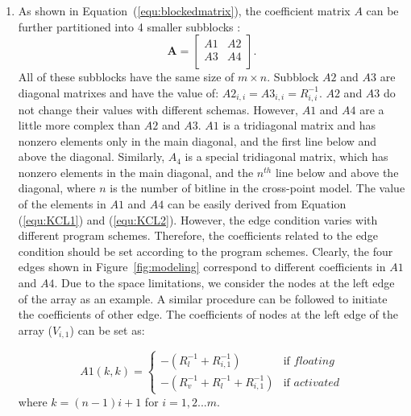 \begin{enumerate}
  \item
  As shown in Equation~(\ref{equ:blockedmatrix}), the coefficient matrix $A$ can be further partitioned into 4 smaller subblocks :
    \begin{equation}\label{equ:blockedmatrix}
        \mathbf{A} = \left[
        \begin{array}{cc}
            A1 & A2  \\
            A3 & A4  \\
        \end{array} \right].
    \end{equation}
All of these subblocks have the same size of $m\times n$. Subblock $A2$ and $A3$ are diagonal matrixes and have the value of: $A2_{i,i} = A3_{i,i} = R_{i,i}^{-1}$. $A2$ and $A3$ do not change their values with different schemas. However, $A1$ and $A4$ are a little more complex than $A2$ and $A3$. $A1$ is a tridiagonal matrix and has nonzero elements only in the main diagonal, and the first line below and above the diagonal. Similarly, $A_4$ is a special tridiagonal matrix, which has nonzero elements in the main diagonal, and the $n^{th}$ line below and above the diagonal, where $n$ is the number of bitline in the cross-point model.
The value of the elements in $A1$ and $A4$ can be easily derived from Equation (\ref{equ:KCL1}) and (\ref{equ:KCL2}). However, the edge condition varies with different program schemes. Therefore, the coefficients related to the edge condition should be set according to the program schemes. Clearly, the four edges shown in Figure~\ref{fig:modeling} correspond to different coefficients in $A1$ and $A4$. Due to the space limitations, we consider the nodes at the left edge of the array as an example. A similar procedure can be followed to initiate the coefficients of other edge. The coefficients of nodes at the left edge of the array ($V_{i,1}$) can be set as:


    \begin{equation}
    A1(k,k) = \left\{
    \begin{array}{ll}
    -(R_l^{-1}+R_{i,1}^{-1})   & \text{if } floating\\
    -(R_v^{-1}+R_l^{-1}+R_{i,1}^{-1})& \text{if } activated
    \end{array} \right.
    \end{equation}
    where $k=(n-1)i+1$ for $i=1,2...m$.


\end{enumerate}
